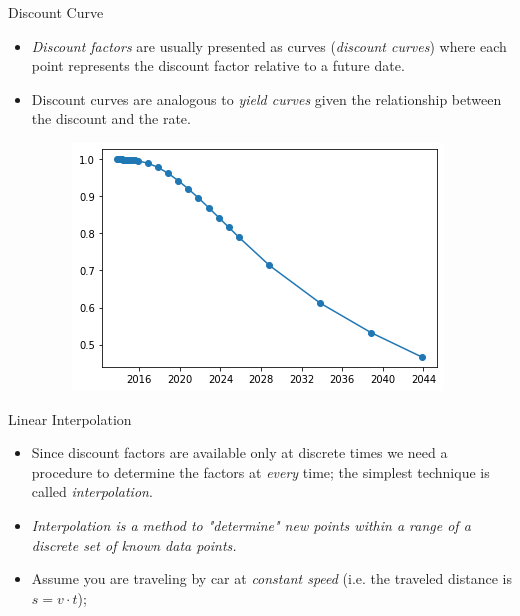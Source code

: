 \documentclass{beamer}
\begin{document}
\begin{frame}{Discount Curve}
  \begin{itemize}
  \item \emph{Discount factors} are usually presented as curves (\emph{discount curves}) where each point represents the discount factor relative to a future date.
  \item Discount curves are analogous to \emph{yield curves} given the relationship between the discount and the rate.
    \begin{figure}[h]
      \begin{center}
        \includegraphics[width=0.55\linewidth]{discount_curve}
      \end{center}
    \end{figure}
  \end{itemize}
\end{frame}

\begin{frame}{Linear Interpolation}
  \begin{itemize}
  \item<1-> Since discount factors are available only at discrete times we need a procedure to determine the factors at \emph{every} time; the simplest technique is called \emph{interpolation}.
  \item<1-> \emph{Interpolation is a method to "determine" new points within a range of a discrete set of known data points.}
  \item<2-> Assume you are traveling by car at \emph{constant speed} (i.e. the traveled distance is $s = v \cdot t$);
  \end{itemize}
\end{frame}
\end{document}

